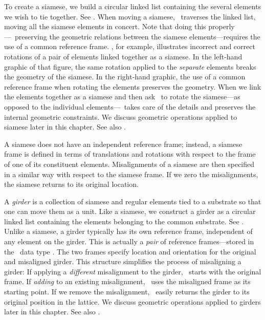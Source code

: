 To create a siamese, we build a circular linked list containing
the several elements we wish to tie together. See .
When moving a siamese, \PTC\ traverses the linked list, moving
all the siamese elements in concert. Note that doing this
properly---\ie\ preserving the geometric relations between the
siamese elements---requires the use of a common reference frame.
, for example, illustrates incorrect and correct rotations of a pair of elements linked together as a siamese.
In the left-hand graphic of that figure, the same rotation applied
to the \emph{separate} elements breaks the geometry of the siamese.
In the right-hand graphic, the use of a common reference frame when
rotating the elements preserves the geometry. When we link the
elements together as a siamese and then ask \PTC\ to rotate the
siamese---as opposed to the individual elements---\PTC\ takes care
of the details and preserves the internal geometric constraints.
We discuss geometric operations applied to siamese later in this
chapter. See also .

A siamese does not have an independent reference frame; instead, a
siamese frame is defined in terms of translations and rotations with
respect to the frame of one of its constituent elements. Misalignments
of a siamese are then specified in a similar way with respect to the
siamese frame. If we zero the misalignments, the siamese returns to
its original location.

%
A \emph{girder} is a collection of siamese and regular elements
tied to a substrate so that one can move them as a unit. Like a
siamese, we construct a girder as a circular linked list containing
the elements belonging to the common substrate. See .
Unlike a siamese, a girder typically has its own reference frame,
independent of any element on the girder. This is actually a
\emph{pair} of reference frames---stored in the \PTC\ data type
. The two frames specify location and
orientation for the original and misaligned girder. This structure
simplifies the process of misaligning a girder: If applying a
\emph{different} misalignment to the girder, \PTC\ starts with
the original frame. If \emph{adding} to an existing misalignment,
\PTC\ uses the misaligned frame as its starting point. If we remove
the misalignment, \PTC\ easily returns the girder to its original
position in the lattice. We discuss geometric operations applied
to girders later in this chapter. See also .

